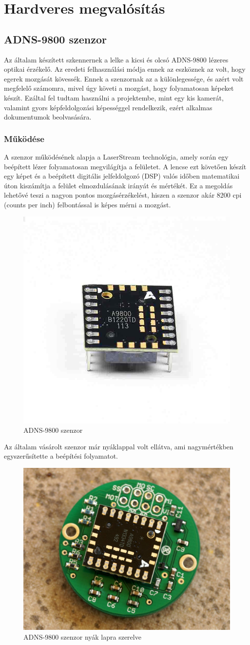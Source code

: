 \documentclass[]{thesis-ekf}
\theoremstyle{definition}
\theoremstyle{remark}
\begin{document}
\chapter{Hardveres megvalósítás}
\section{ADNS-9800 szenzor}
Az általam készített szkennernek a lelke a kicsi és olcsó ADNS-9800\cite{adns9800} lézeres optikai érzékelő. Az eredeti felhasználási módja ennek az eszköznek az volt, hogy egerek mozgását kövessék. Ennek a szenzornak az a különlegessége, és azért volt megfelelő számomra, mivel úgy követi a mozgást, hogy folyamatosan képeket készít. Ezáltal fel tudtam használni a projektembe, mint egy kis kamerát, valamint gyors képfeldolgozási képességgel rendelkezik, ezért alkalmas dokumentumok beolvasására. 
\subsection{Működése}
 A szenzor működésének alapja a LaserStream technológia, amely során egy beépített lézer folyamatosan megvilágítja a felületet. A lencse ezt követően készít egy képet és a beépített digitális jelfeldolgozó (DSP) valós időben matematikai úton kiszámítja a felület elmozdulásának irányát és mértékét. Ez a megoldás lehetővé teszi a nagyon pontos mozgásérzékelést, hiszen a szenzor akár 8200 cpi (counts per inch) felbontással is képes mérni a mozgást.
\begin{figure}[th!]
	\centering
	\includegraphics[width=0.35\linewidth]{ADNS9800base}
	\caption[ADNS9800]{ADNS-9800 szenzor}
	\label{fig:adns9800base}
\end{figure}

Az általam vásárolt szenzor már nyáklappal volt ellátva, ami nagymértékben egyszerűsítette a beépítési folyamatot. \cite{adns9800_buy}

\begin{figure}[th!]
	\centering
	\includegraphics[width=0.3\linewidth]{ADNS9800}
	\caption[ADNS9800]{ADNS-9800 szenzor nyák lapra szerelve}
	\label{fig:adns9800}
\end{figure}
\end{document}
